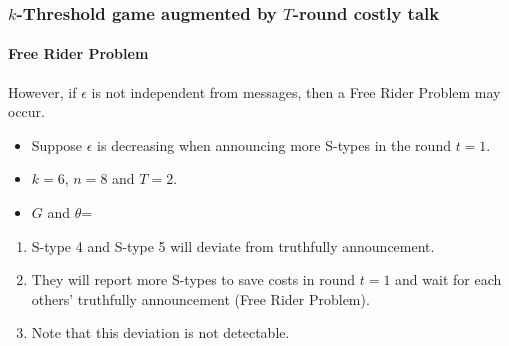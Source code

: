 \documentclass[9pt,handout]{beamer}
\begin{document}
\begin{frame}
   \frametitle{$k$-Threshold game augmented by $T$-round costly talk}
\framesubtitle{Free Rider Problem}

\alert{However}, if $\epsilon$ is \alert{not independent from messages}, then a \alert{Free Rider Problem} may occur.
\begin{itemize}
\item Suppose $\epsilon$ \alert{is decreasing} when announcing \alert{more} S-types in the round \alert{$t=1$}.
\item $k=6$, $n=8$ and $T=2$.
\item $G$ and $\theta$=
\begin{center}
\end{center}



\end{itemize}

\begin{enumerate}
\item S-type \alert{4} and S-type \alert{5} will deviate from truthfully announcement.
\item They will report more S-types to save costs in round $t=1$ and wait for each others' truthfully announcement (Free Rider Problem).
\item Note that this deviation is not detectable.
\end{enumerate}


\end{frame}
\end{document}
